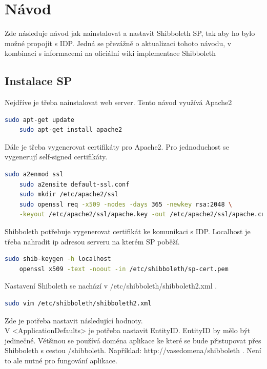 \chapter{Návod}
\label{návod}

Zde následuje návod jak nainstalovat a nastavit Shibboleth SP, tak aby ho bylo možné propojit s IDP. Jedná se převážně o aktualizaci tohoto návodu\cite{shibbolethSpInstallation}, v kombinaci s informacemi na oficiální wiki implementace Shibboleth\cite{shibbolethWikiSP}

\section{Instalace SP}

Nejdříve je třeba nainstalovat web server. Tento návod využívá Apache2
\begin{lstlisting}[language=Bash]
    sudo apt-get update
    sudo apt-get install apache2
\end{lstlisting}

Dále je třeba vygenerovat certifikáty pro Apache2. Pro jednoduchost se vygenerují self-signed certifikáty.
\begin{lstlisting}[language=Bash]
    sudo a2enmod ssl
    sudo a2ensite default-ssl.conf
    sudo mkdir /etc/apache2/ssl
    sudo openssl req -x509 -nodes -days 365 -newkey rsa:2048 \
    -keyout /etc/apache2/ssl/apache.key -out /etc/apache2/ssl/apache.crt
\end{lstlisting}

Shibboleth potřebuje vygenerovat certifikát ke komunikaci s IDP. Localhost je třeba nahradit ip adresou serveru na kterém SP poběží.
\begin{lstlisting}[language=Bash]
    sudo shib-keygen -h localhost
    openssl x509 -text -noout -in /etc/shibboleth/sp-cert.pem
\end{lstlisting}

Nastavení Shiboleth se nachází v /etc/shibboleth/shibboleth2.xml .

\begin{lstlisting}[language=Bash]
   sudo vim /etc/shibboleth/shibboleth2.xml
\end{lstlisting}

Zde je potřeba nastavit následující hodnoty. \\V <ApplicationDefaults> je potřeba nastavit EntityID. EntityID by mělo být jedinečné. Většinou se používá doména aplikace ke které se bude přistupovat přes Shibboleth s cestou /shibboleth. Například: http://vasedomena/shibboleth . Není to ale nutné pro fungování aplikace.

